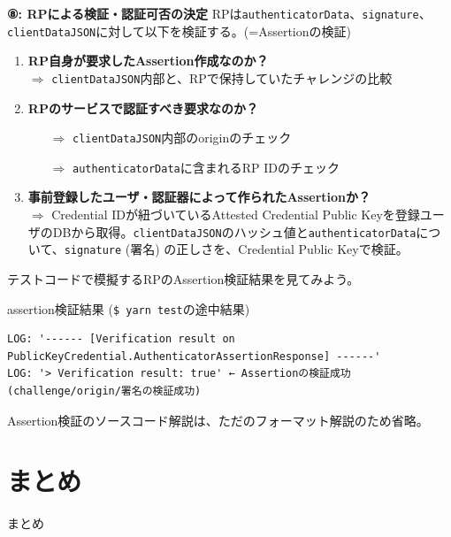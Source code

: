 \documentclass[12pt,dvipdfmx,uplatex]{beamer}
\begin{document}
\begin{frame}
\textbf{⑧: RPによる検証・認証可否の決定}
\small
RPは\texttt{authenticatorData}、\texttt{signature}、\texttt{clientDataJSON}に対して以下を検証する。(=\alert{Assertionの検証})
\begin{enumerate}
 \item \textbf{RP自身が要求したAssertion作成なのか？}\\
$\Rightarrow$ \texttt{clientDataJSON}内部と、RPで保持していたチャレンジの比較
 \item \textbf{RPのサービスで認証すべき要求なのか？}\\
\begin{itemize}
 \item[$\Rightarrow$] \texttt{clientDataJSON}内部のoriginのチェック
 \item[$\Rightarrow$] \texttt{authenticatorData}に含まれるRP IDのチェック
\end{itemize}
 \item \textbf{事前登録したユーザ・認証器によって作られたAssertionか？}\\
$\Rightarrow$ Credential IDが紐づいているAttested Credential Public Keyを登録ユーザのDBから取得。\alert{\texttt{clientDataJSON}のハッシュ値と\texttt{authenticatorData}について、\texttt{signature} (署名) の正しさを、Credential Public Keyで検証。}
\end{enumerate}
\end{frame}


\begin{frame}[fragile]
テストコードで模擬するRPのAssertion検証結果を見てみよう。
\begin{exampleblock}{\scriptsize assertion検証結果 (\texttt{\$ yarn test}の途中結果)}
\tiny
\begin{verbatim}
LOG: '------ [Verification result on PublicKeyCredential.AuthenticatorAssertionResponse] ------'
LOG: '> Verification result: true' ← Assertionの検証成功 (challenge/origin/署名の検証成功)
\end{verbatim}
\end{exampleblock}
Assertion検証のソースコード解説は、ただのフォーマット解説のため省略。
\end{frame}

\section{まとめ}
\begin{frame}
\centering
{\huge まとめ}
\end{frame}
\end{document}

